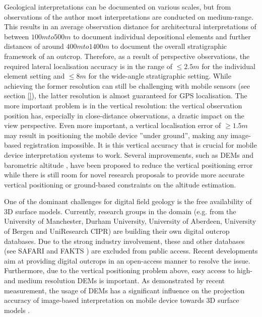 \documentclass[review]{elsarticle}
\begin{document}
Geological interpretations can be documented on various scales, but from observations of the author most interpretations are conducted on medium-range. This results in an average observation distance for architectural interpretations of between $100m to 500m$ to document individual depositional elements and further distances of around $400m to 1400m$ to document the overall stratigraphic framework of an outcrop. Therefore, as a result of perspective observations, the required lateral localisation accuracy is in the range of $\leq 2.5m$ for the individual element setting and $\leq 8m$ for the wide-angle stratigraphic setting. While achieving the former resolution can still be challenging with mobile sensors (see section \ref{}), the latter resolution is almost guaranteed for GPS localisation. The more important problem is in the vertical resolution: the vertical observation position has, especially in close-distance observations, a drastic impact on the view perspective. Even more important, a vertical localisation error of  $\geq 1.5m$ may result in positioning the mobile device ''under ground'', making any image-based registration impossible. It is this vertical accuracy that is crucial for mobile device interpretation systems to work. Several improvements, such as \glspl{DEM} and barometric altitude \cite{Kehl2017_VGC}, have been proposed to reduce the vertical positioning error while there is still room for novel research proposals to provide more accurate vertical positioning or ground-based constraints on the altitude estimation.

One of the dominant challenges for digital field geology is the free availability of 3D surface models. Currently, research groups in the domain (e.g. from the University of Manchester, Durham University, University of Aberdeen, University of Bergen and UniResearch CIPR) are building their own digital outcrop databases. Due to the strong industry involvement, these and other databases (see SAFARI \cite{Dreyer1993} and FAKTS \cite{Colombera2012a}) are excluded from public access. Recent developments aim at providing digital outcrops in an open-access manner \cite{Cawood2018} to resolve the issue. Furthermore, due to the vertical positioning problem above, easy access to high- and medium resolution \glspl{DEM} is important. As demonstrated by recent measurement, the usage of \glspl{DEM} has a significant influence on the projection accuracy of image-based interpretation on mobile device towards 3D surface models \cite{Kehl2017_VGC}.
\end{document}
